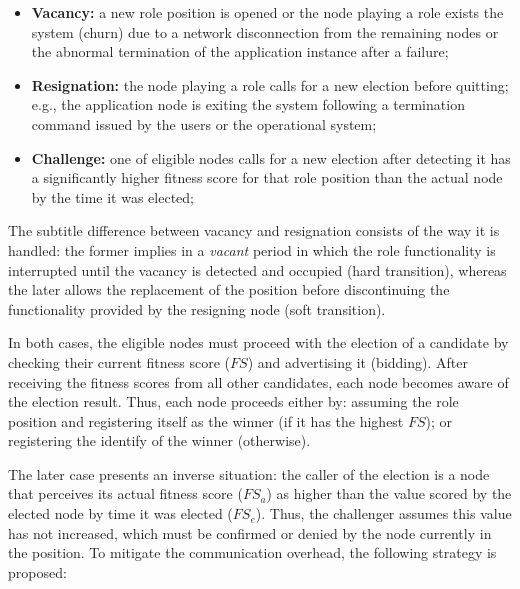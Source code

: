 \begin{itemize}
	
	\item \textbf{Vacancy:} a new role position is opened or the node playing a role exists the system (churn) due to a network disconnection from the remaining nodes or the abnormal termination of the application instance after a failure;
	
	\item \textbf{Resignation:} the node playing a role calls for a new election before quitting; e.g., the application node is exiting the system following a termination command issued by the users or the operational system;
	
	\item \textbf{Challenge:} one of eligible nodes calls for a new election after detecting it has a significantly higher fitness score for that role position than the actual node by the time it was elected;
	
	
\end{itemize}
\medskip
 
The subtitle difference between vacancy and resignation consists of the way it is handled: the former implies in a \textit{vacant} period in which the role functionality is interrupted until the vacancy is detected and occupied (hard transition), whereas the later allows the replacement of the position before discontinuing the functionality provided by the resigning node (soft transition). 

In both cases, the eligible nodes must proceed with the election of a candidate by checking their current fitness score ($FS$) and advertising it (bidding). After receiving the fitness scores from all other candidates, each node becomes aware of the election result. Thus, each node proceeds either by: assuming the role position and registering itself as the winner (if it has the highest $FS$); or registering the identify of the winner (otherwise). 

The later case presents an inverse situation: the caller of the election is a node that perceives its actual fitness score ($FS_a$) as higher than the value scored by the elected node by time it was elected ($FS_e$). Thus, the challenger assumes this value has not increased, which must be confirmed or denied by the node currently in the position. To mitigate the communication overhead, the following strategy is proposed:

